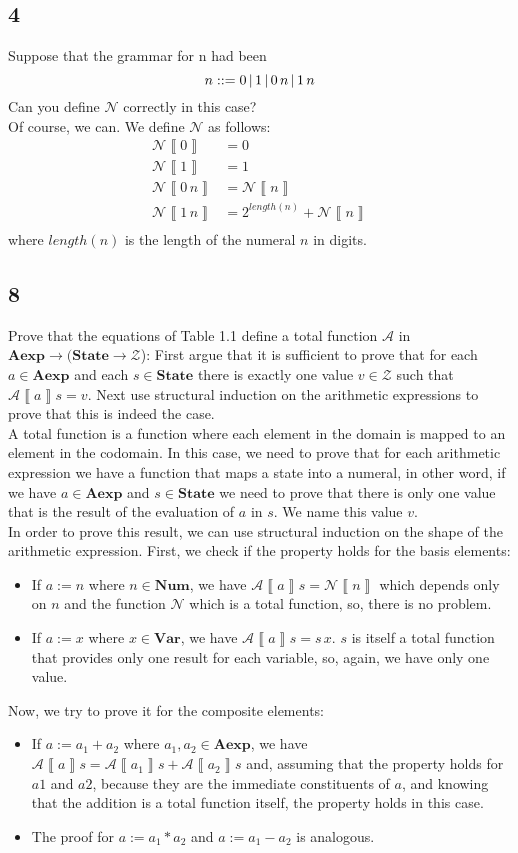\documentclass[spanish, a4paper, 12pt] {article}
\newcommand{\aexp}[0]{\textbf{Aexp}}
\newcommand{\num}[0]{\textbf{Num}}
\newcommand{\state}[0]{\textbf{State}}
\newcommand{\var}[0]{\textbf{Var}}
\newcommand{\A}[0]{\mathcal{A}}
\newcommand{\N}[0]{\mathcal{N}}
\newcommand{\Z}[0]{\mathcal{Z}}
\newcommand{\eval}[1]{\left\llbracket #1 \right\rrbracket}
\renewcommand{\=}[0]{:=}
\renewcommand{\;}[0]{\mbox{; }}
\begin{document}
\subsection{4}
Suppose that the grammar for n had been
$$n\space::= 0 \,|\, 1 \,|\, 0 \, n \,|\, 1 \, n$$
Can you define $\N$ correctly in this case?\\

Of course, we can. We define $\N$ as follows:
\begin{align*}
    \N\eval{0} &= 0\\
    \N\eval{1} &= 1\\
    \N\eval{0\,n} &= \N\eval{n}\\
    \N\eval{1\,n} &= 2^{length(n)} + \N\eval{n}\\
\end{align*}
where $length(n)$ is the length of the numeral $n$ in digits.
\subsection{8}
Prove that the equations of Table 1.1 define a total function $\A$ in $\aexp \rightarrow (\state \rightarrow \Z$): First argue that it is sufficient to prove that for each $a \in \aexp$ and each $s \in \state$ there is exactly one value $v \in \Z$ such that $\A\eval{a}s = v$. Next use structural induction on the arithmetic expressions to prove that this is indeed the case.\\

A total function is a function where each element in the domain is mapped to an element in the codomain. In this case, we need to prove that for each arithmetic expression we have a function that maps a state into a numeral, in other word, if we have $a \in \aexp$ and $s \in \state$ we need to prove that there is only one value that is the result of the evaluation of $a$ in $s$. We name this value $v$.\\

In order to prove this result, we can use structural induction on the shape of the arithmetic expression. First, we check if the property holds for the basis elements:
\begin{itemize}
    \item If $a := n$ where $n \in \num$, we have $\A\eval{a}s = \N\eval{n}$ which depends only on $n$ and the function $\N$ which is a total function, so, there is no problem.
    \item If $a := x$ where $x \in \var$, we have $\A\eval{a}s = s\,x$. $s$ is itself a total function that provides only one result for each variable, so, again, we have only one value.
\end{itemize}
Now, we try to prove it for the composite elements:
\begin{itemize}
    \item If $a := a_1 + a_2$ where $a_1, a_2 \in \aexp$, we have $\A\eval{a}s = \A\eval{a_1}s + \A\eval{a_2}s$ and, assuming that the property holds for $a1$ and $a2$, because they are the immediate constituents of $a$, and knowing that the addition is a total function itself, the property holds in this case.
    \item The proof for $a := a_1 * a_2$ and $a := a_1 - a_2$ is analogous.
\end{itemize}
\end{document}
